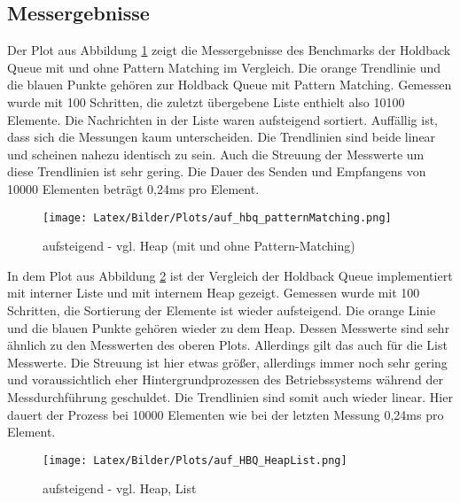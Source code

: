 \subsection{Messergebnisse}

Der Plot aus Abbildung \ref{fig:auf_hbq_pattern} zeigt die Messergebnisse des Benchmarks der Holdback Queue mit und ohne Pattern Matching im Vergleich. Die orange Trendlinie und die blauen Punkte gehören zur Holdback Queue mit Pattern Matching. Gemessen wurde mit 100 Schritten, die zuletzt übergebene Liste enthielt also 10100 Elemente. Die Nachrichten in der Liste waren aufsteigend sortiert. Auffällig ist, dass sich die Messungen kaum unterscheiden. Die Trendlinien sind beide linear und scheinen nahezu identisch zu sein. Auch die Streuung der Messwerte um diese Trendlinien ist sehr gering. Die Dauer des Senden und Empfangens von 10000 Elementen beträgt 0,24ms pro Element.

\begin{figure}[htbp]
\begin{center}
\texttt{[image: Latex/Bilder/Plots/auf\_hbq\_patternMatching.png]}
\caption{\label{fig:auf_hbq_pattern} aufsteigend - vgl. Heap (mit und ohne Pattern-Matching)} 
\end{center}
\end{figure}

In dem Plot aus Abbildung \ref{fig:auf_heapList} ist der Vergleich der Holdback Queue implementiert mit interner Liste und mit internem Heap gezeigt. Gemessen wurde mit 100 Schritten, die Sortierung der Elemente ist wieder aufsteigend. Die orange Linie und die blauen Punkte gehören wieder zu dem Heap. Dessen Messwerte sind sehr ähnlich zu den Messwerten des oberen Plots. Allerdings gilt das auch für die List Messwerte. Die Streuung ist hier etwas größer, allerdings immer noch sehr gering und voraussichtlich eher Hintergrundprozessen des Betriebssystems während der Messdurchführung geschuldet. Die Trendlinien sind somit auch wieder linear. Hier dauert der Prozess bei 10000 Elementen wie bei der letzten Messung 0,24ms pro Element. 

\begin{figure}[htbp]
\begin{center}
\texttt{[image: Latex/Bilder/Plots/auf\_HBQ\_HeapList.png]}
\caption{\label{fig:auf_heapList} aufsteigend - vgl. Heap, List} 
\end{center}
\end{figure}

